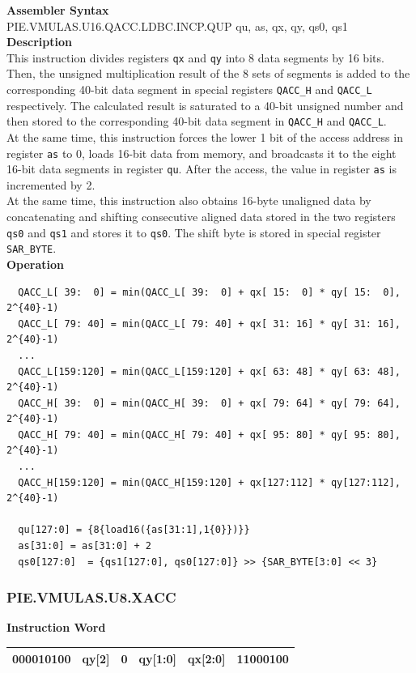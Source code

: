 \textbf{Assembler Syntax} \\
PIE.VMULAS.U16.QACC.LDBC.INCP.QUP qu, as, qx, qy, qs0, qs1 \\
\textbf{Description} \\
This instruction divides registers \lstinline{qx} and \lstinline{qy} into 8 data segments by 16 bits. Then, the unsigned multiplication result of the 8 sets of segments is added to the corresponding 40-bit data segment in special registers \lstinline{QACC_H} and \lstinline{QACC_L} respectively. The calculated result is saturated to a 40-bit unsigned number and then stored to the corresponding 40-bit data segment in \lstinline{QACC_H} and \lstinline{QACC_L}.\\
At the same time, this instruction forces the lower 1 bit of the access address in register \lstinline{as} to 0, loads 16-bit data from memory, and broadcasts it to the eight 16-bit data segments in register \lstinline{qu}. After the access, the value in register \lstinline{as} is incremented by 2.\\
At the same time, this instruction also obtains 16-byte unaligned data by concatenating and shifting consecutive aligned data stored in the two registers \lstinline{qs0} and \lstinline{qs1} and stores it to \lstinline{qs0}. The shift byte is stored in special register \lstinline{SAR_BYTE}.\\
\textbf{Operation}
\begin{lstlisting}
  QACC_L[ 39:  0] = min(QACC_L[ 39:  0] + qx[ 15:  0] * qy[ 15:  0], 2^{40}-1)
  QACC_L[ 79: 40] = min(QACC_L[ 79: 40] + qx[ 31: 16] * qy[ 31: 16], 2^{40}-1)
  ...
  QACC_L[159:120] = min(QACC_L[159:120] + qx[ 63: 48] * qy[ 63: 48], 2^{40}-1)
  QACC_H[ 39:  0] = min(QACC_H[ 39:  0] + qx[ 79: 64] * qy[ 79: 64], 2^{40}-1)
  QACC_H[ 79: 40] = min(QACC_H[ 79: 40] + qx[ 95: 80] * qy[ 95: 80], 2^{40}-1)
  ...
  QACC_H[159:120] = min(QACC_H[159:120] + qx[127:112] * qy[127:112], 2^{40}-1)

  qu[127:0] = {8{load16({as[31:1],1{0}})}}
  as[31:0] = as[31:0] + 2
  qs0[127:0]  = {qs1[127:0], qs0[127:0]} >> {SAR_BYTE[3:0] << 3}
\end{lstlisting}

\newpage
\subsubsection{PIE.VMULAS.U8.XACC}\label{instruction:PIEVMULASU8XACC}
\setlength\tabcolsep{6pt}
\textbf{Instruction Word} \\
\begin{tabular}{|c|c|c|c|c|c|}
	\hline
	000010100 & qy[2] & 0 & qy[1:0] & qx[2:0] & 11000100 \\
	\hline
\end{tabular}

